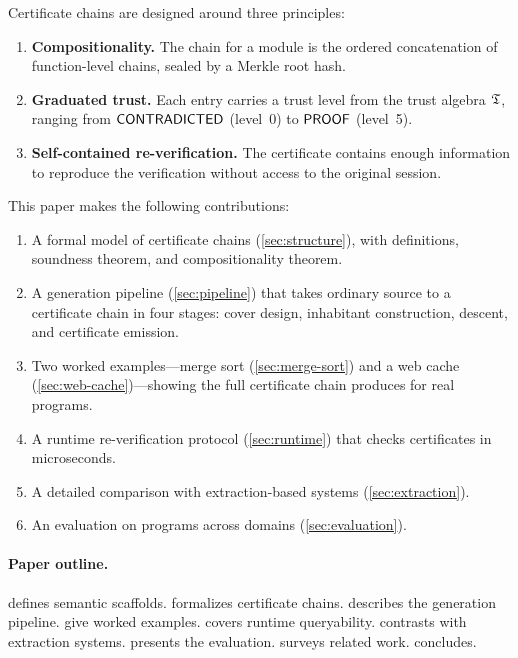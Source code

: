 \documentclass[11pt]{article}
\begin{document}
Certificate chains are designed around three principles:
\begin{enumerate}[label=(\roman*)]
  \item \textbf{Compositionality.}  The chain for a module is the
    ordered concatenation of function-level chains, sealed by a
    Merkle root hash.
  \item \textbf{Graduated trust.}  Each entry carries a trust level
    from the \JuGeo{} trust algebra $\mathfrak{T}$, ranging from
    $\mathsf{CONTRADICTED}$ (level~0) to $\mathsf{PROOF}$ (level~5).
  \item \textbf{Self-contained re-verification.}  The certificate
    contains enough information to reproduce the verification
    without access to the original \JuGeo{} session.
\end{enumerate}

This paper makes the following contributions:
\begin{enumerate}
  \item A formal model of certificate chains (\cref{sec:structure}),
    with definitions, soundness theorem, and compositionality theorem.
  \item A generation pipeline (\cref{sec:pipeline}) that takes
    ordinary \Python{} source to a certificate chain in four stages:
    cover design, inhabitant construction, descent, and certificate
    emission.
  \item Two worked examples---merge sort (\cref{sec:merge-sort}) and
    a web cache (\cref{sec:web-cache})---showing the full certificate
    chain \JuGeo{} produces for real programs.
  \item A runtime re-verification protocol (\cref{sec:runtime}) that
    checks certificates in microseconds.
  \item A detailed comparison with extraction-based systems
    (\cref{sec:extraction}).
  \item An evaluation on \expTotalPrograms{} programs across
    \expDomainCount{} domains (\cref{sec:evaluation}).
\end{enumerate}

\paragraph{Paper outline.}
 defines semantic scaffolds.
 formalizes certificate chains.
 describes the generation pipeline.
 give worked examples.
 covers runtime queryability.
 contrasts with extraction systems.
 presents the evaluation.
 surveys related work.
 concludes.
\end{document}
